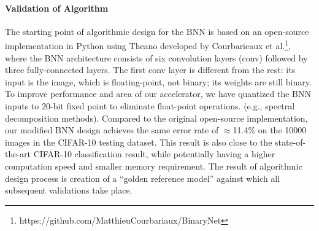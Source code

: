 \paragraph{Validation of Algorithm}
The starting point of algorithmic design for the BNN is based on an open-source implementation in Python using Theano developed by Courbarieaux et al.\footnote{https://github.com/MatthieuCourbariaux/BinaryNet}, where the BNN architecture consists of six convolution layers (conv) followed by three fully-connected layers. The first conv layer is different from the rest: its input is the image, which is floating-point, not binary; its weights are still binary. To improve performance and area of our accelerator, we have quantized the BNN inputs to 20-bit fixed point to eliminate float-point operations.  
(e.g., spectral decomposition methods). Compared to the original open-source implementation, our modified BNN design achieves the same error rate of $\approx$11.4\% on the 10000 images in the CIFAR-10 testing dataset. This result is also close to the state-of-the-art CIFAR-10
classification result, while potentially having a higher computation
speed and smaller memory requirement. The result of algorithmic design
process is creation of a ``golden reference model'' against which all
subsequent validations take place.




